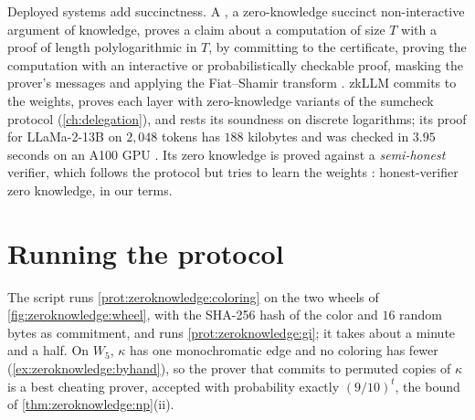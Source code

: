\begin{refsection}
Deployed systems add succinctness. A , a zero-knowledge succinct non-interactive argument of knowledge, proves a claim about a computation of size $T$ with a proof of length polylogarithmic in $T$, by committing to the certificate, proving the computation with an interactive or probabilistically checkable proof, masking the prover's messages and applying the Fiat--Shamir transform \parencite{Thaler2022}. zkLLM commits to the weights, proves each layer with zero-knowledge variants of the sumcheck protocol (\cref{ch:delegation}), and rests its soundness on discrete logarithms; its proof for LLaMa-2-13B on $2{,}048$ tokens has $188$ kilobytes and was checked in $3.95$ seconds on an A100 GPU \parencite[Table~1]{SunLiZhang2024}. Its zero knowledge is proved against a \emph{semi-honest} verifier, which follows the protocol but tries to learn the weights \parencite[Sections~3.6 and~7.2]{SunLiZhang2024}: honest-verifier zero knowledge, in our terms.

\section{Running the protocol}\label{sec:zeroknowledge:running}

The script \zeroknowledgescript{} runs \cref{prot:zeroknowledge:coloring} on the two wheels of \cref{fig:zeroknowledge:wheel}, with the SHA-256 hash of the color and $16$ random bytes as commitment, and runs \cref{prot:zeroknowledge:gi}; it takes about a minute and a half. On $W_5$, $\kappa$ has one monochromatic edge and no coloring has fewer (\cref{ex:zeroknowledge:byhand}), so the prover that commits to permuted copies of $\kappa$ is a best cheating prover, accepted with probability exactly $(9/10)^t$, the bound of \cref{thm:zeroknowledge:np}(ii).


\end{refsection}
